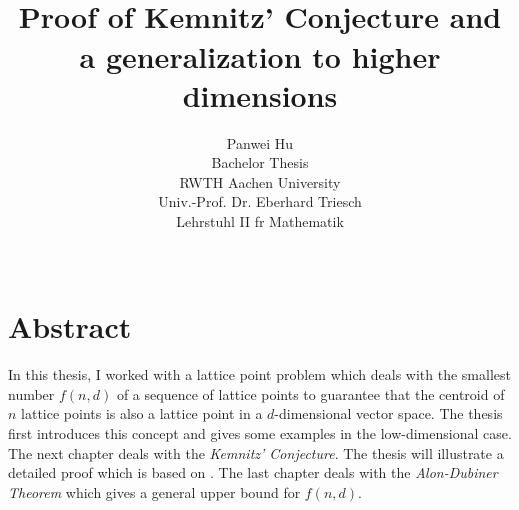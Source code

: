 \documentclass[12pt]{article}
\title{ \normalsize
		\HRule{0.5pt} \\
		\Huge \textbf{Proof of Kemnitz' Conjecture and a generalization to higher dimensions}
		\HRule{2pt} \\ [0.5cm]
		\normalsize  \vspace*{5\baselineskip}}
\date{}
\author{
        \vspace{30pt}
        \LARGE{Panwei Hu}\\ 
        \vspace{25pt}  
        \LARGE{Bachelor Thesis}\\
        \vspace{10pt}  
        \LARGE{RWTH Aachen University}\\
        \vspace{10pt}  
        \LARGE{Univ.-Prof. Dr. Eberhard Triesch}\\
        \vspace{10pt}  
        \LARGE{Lehrstuhl II f\uUmlaut{}r Mathematik}\\
        \\ }
\theoremstyle{definition}
\numberwithin{equation}{theorem}
\numberwithin{figure}{theorem}
\newcommand{\kemnitzConjecture}{\emph{Kemnitz' Conjecture}}
\newcommand{\alonDubinerTheorem}{\emph{Alon-Dubiner Theorem}}
\begin{document}

















\maketitle
\newpage
\tableofcontents
  \newpage
\newpage
{}
\newpage

\section{Abstract}
In this thesis, I worked with a lattice point problem which deals with the smallest number $f(n,d)$
of a sequence of lattice points to guarantee that the centroid of $n$ lattice points is also a lattice point in a $d$-dimensional vector space. 
The thesis first introduces
this concept and gives some examples in the low-dimensional case. The next chapter deals with the \kemnitzConjecture.
The thesis will illustrate a detailed proof which is based on \cite{Reiher_2007}. The last chapter deals with the \alonDubinerTheorem{} which
gives a general upper bound for $f(n,d)$.
\end{document}
